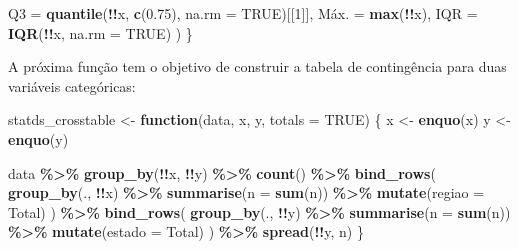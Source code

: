 \documentclass[
]{latex/krantz}
\newenvironment{Shaded}{\begin{snugshade}}{\end{snugshade}}
\newcommand{\AttributeTok}[1]{\textcolor[rgb]{0.13,0.29,0.53}{#1}}
\newcommand{\ConstantTok}[1]{\textcolor[rgb]{0.56,0.35,0.01}{#1}}
\newcommand{\ControlFlowTok}[1]{\textcolor[rgb]{0.13,0.29,0.53}{\textbf{#1}}}
\newcommand{\DecValTok}[1]{\textcolor[rgb]{0.00,0.00,0.81}{#1}}
\newcommand{\FloatTok}[1]{\textcolor[rgb]{0.00,0.00,0.81}{#1}}
\newcommand{\FunctionTok}[1]{\textcolor[rgb]{0.13,0.29,0.53}{\textbf{#1}}}
\newcommand{\NormalTok}[1]{#1}
\newcommand{\OtherTok}[1]{\textcolor[rgb]{0.56,0.35,0.01}{#1}}
\newcommand{\SpecialCharTok}[1]{\textcolor[rgb]{0.81,0.36,0.00}{\textbf{#1}}}
\newcommand{\StringTok}[1]{\textcolor[rgb]{0.31,0.60,0.02}{#1}}
\theoremstyle{definition}
\theoremstyle{definition}
\theoremstyle{definition}
\theoremstyle{definition}
\theoremstyle{remark}
\begin{document}
\begin{Shaded}
\begin{Highlighting}[]
        \StringTok{\textasciigrave{}}\AttributeTok{Q3}\StringTok{\textasciigrave{}} \OtherTok{=} \FunctionTok{quantile}\NormalTok{(}\SpecialCharTok{!!}\NormalTok{x, }\FunctionTok{c}\NormalTok{(}\FloatTok{0.75}\NormalTok{), }\AttributeTok{na.rm =} \ConstantTok{TRUE}\NormalTok{)[[}\DecValTok{1}\NormalTok{]],}
        \StringTok{\textasciigrave{}}\AttributeTok{Máx.}\StringTok{\textasciigrave{}} \OtherTok{=} \FunctionTok{max}\NormalTok{(}\SpecialCharTok{!!}\NormalTok{x),}
        \StringTok{\textasciigrave{}}\AttributeTok{IQR}\StringTok{\textasciigrave{}} \OtherTok{=} \FunctionTok{IQR}\NormalTok{(}\SpecialCharTok{!!}\NormalTok{x, }\AttributeTok{na.rm =} \ConstantTok{TRUE}\NormalTok{)}
\NormalTok{    )}
\NormalTok{\}}
\end{Highlighting}
\end{Shaded}

A próxima função tem o objetivo de construir a tabela de contingência para duas variáveis categóricas:

\begin{Shaded}
\begin{Highlighting}[]
\NormalTok{statds\_crosstable }\OtherTok{\textless{}{-}} \ControlFlowTok{function}\NormalTok{(data, x, y, }\AttributeTok{totals =} \ConstantTok{TRUE}\NormalTok{) \{}
\NormalTok{  x }\OtherTok{\textless{}{-}} \FunctionTok{enquo}\NormalTok{(x)}
\NormalTok{  y }\OtherTok{\textless{}{-}} \FunctionTok{enquo}\NormalTok{(y)}
  
\NormalTok{  data }\SpecialCharTok{\%\textgreater{}\%}
    \FunctionTok{group\_by}\NormalTok{(}\SpecialCharTok{!!}\NormalTok{x, }\SpecialCharTok{!!}\NormalTok{y) }\SpecialCharTok{\%\textgreater{}\%}
    \FunctionTok{count}\NormalTok{() }\SpecialCharTok{\%\textgreater{}\%}
    \FunctionTok{bind\_rows}\NormalTok{(}
      \FunctionTok{group\_by}\NormalTok{(., }\SpecialCharTok{!!}\NormalTok{x) }\SpecialCharTok{\%\textgreater{}\%}
        \FunctionTok{summarise}\NormalTok{(}\AttributeTok{n =} \FunctionTok{sum}\NormalTok{(n)) }\SpecialCharTok{\%\textgreater{}\%}
        \FunctionTok{mutate}\NormalTok{(}\AttributeTok{regiao =} \StringTok{\textquotesingle{}Total\textquotesingle{}}\NormalTok{)}
\NormalTok{    ) }\SpecialCharTok{\%\textgreater{}\%}
    \FunctionTok{bind\_rows}\NormalTok{(}
      \FunctionTok{group\_by}\NormalTok{(., }\SpecialCharTok{!!}\NormalTok{y) }\SpecialCharTok{\%\textgreater{}\%}
        \FunctionTok{summarise}\NormalTok{(}\AttributeTok{n =} \FunctionTok{sum}\NormalTok{(n)) }\SpecialCharTok{\%\textgreater{}\%}
        \FunctionTok{mutate}\NormalTok{(}\AttributeTok{estado =} \StringTok{\textquotesingle{}Total\textquotesingle{}}\NormalTok{)}
\NormalTok{    ) }\SpecialCharTok{\%\textgreater{}\%}
    \FunctionTok{spread}\NormalTok{(}\SpecialCharTok{!!}\NormalTok{y, n)}
\NormalTok{\}}
\end{Highlighting}
\end{Shaded}
\end{document}
